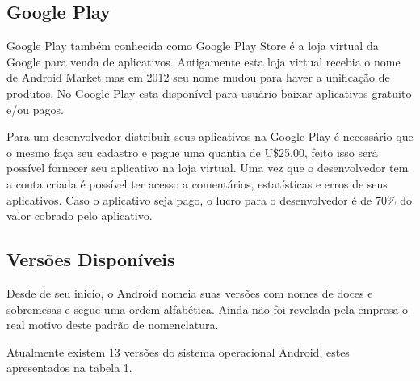 \subsection{Google Play }

Google Play também conhecida como Google Play Store é a loja virtual da Google para venda de aplicativos. Antigamente esta loja virtual recebia o nome de Android Market mas em 2012 seu nome mudou para haver a unificação de produtos.
No Google Play esta disponível para usuário baixar aplicativos gratuito e/ou pagos. \cite{gp}

Para um desenvolvedor distribuir seus aplicativos na Google Play é necessário que o mesmo faça seu cadastro e pague uma quantia de U\$25,00, feito isso será possível fornecer seu aplicativo na loja virtual. Uma vez que o desenvolvedor tem a conta criada é possível ter acesso a comentários, estatísticas e erros de seus aplicativos. Caso o aplicativo seja pago, o lucro para o desenvolvedor é de 70\% do valor cobrado pelo aplicativo. \cite{tt}

\subsection{Versões Disponíveis}

Desde de seu inicio, o Android nomeia suas versões com nomes de doces e sobremesas e segue uma ordem alfabética. Ainda não foi revelada pela empresa o real motivo deste padrão de nomenclatura.

Atualmente existem 13 versões do sistema operacional Android, estes apresentados na tabela 1. \cite{vs}

